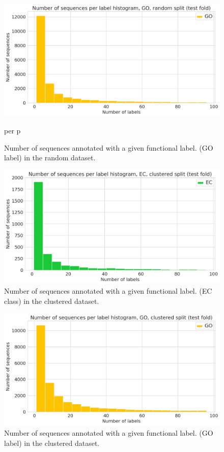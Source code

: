\begin{figure}[htbp]
\centering
  \includegraphics[width=\textwidth]{sequences_per_label_go_random.png}
  \caption{Number of sequences annotated with a given functional label. (GO label) in the random dataset.}per p
\end{figure}
\pagebreak
\begin{figure}[htbp]
\centering
  \includegraphics[width=\textwidth]{sequences_per_label_ec_clustered.png}
  \caption{Number of sequences annotated with a given functional label. (EC class) in the clustered dataset.}
\end{figure}
\begin{figure}[htbp]
\centering
  \includegraphics[width=\textwidth]{sequences_per_label_go_clustered.png}
  \caption{Number of sequences annotated with a given functional label. (GO label) in the clustered dataset.}
\end{figure}

